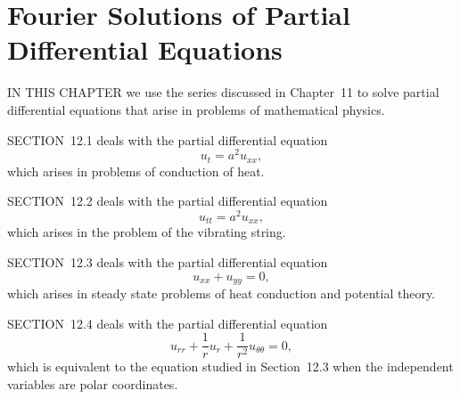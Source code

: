 \chapter{Fourier Solutions of Partial Differential Equations}

\noindent
IN THIS CHAPTER we use the series discussed in Chapter~11 to solve partial differential equations
that arise in problems of mathematical physics.

\medskip
\noindent
SECTION~12.1 deals with the partial differential equation
\[
  u_{t}=a^{2}u_{xx},
\]
which arises in problems of conduction of heat.

\medskip
\noindent
SECTION~12.2 deals with the partial differential equation
\[
  u_{tt}=a^{2}u_{xx},
\]
which arises in the problem of the vibrating string.

\medskip
\noindent
SECTION~12.3 deals with the partial differential equation
\[
  u_{xx}+u_{yy}=0,
\]
which arises in steady state problems of heat conduction and potential theory.

\medskip
\noindent
SECTION~12.4 deals with the partial differential equation
\[
  u_{rr}+\frac{1}{r}u_{r}+\frac{1}{r^{2}}u_{\theta\theta}=0,
\]
which is equivalent to the equation studied in Section~12.3 when the independent variables are
polar coordinates.

\newpage








